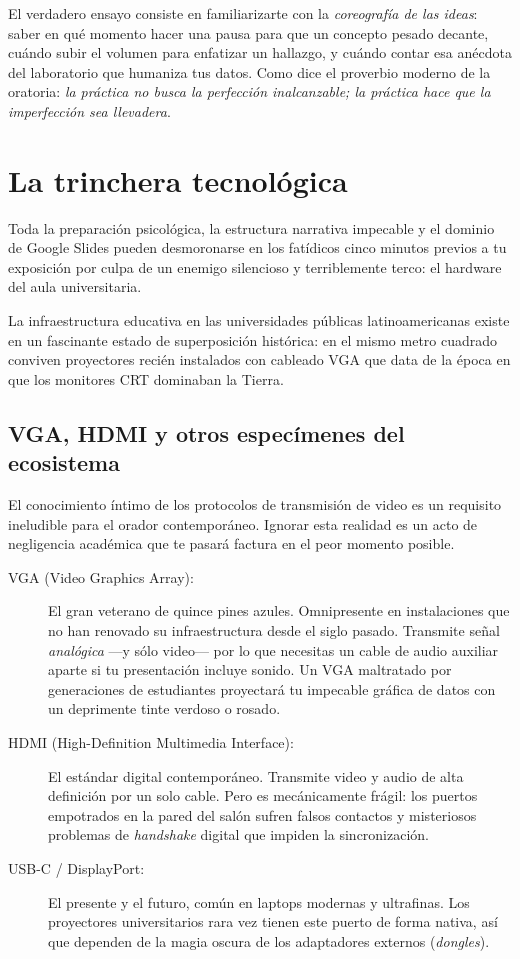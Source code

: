 El verdadero ensayo consiste en familiarizarte con la \emph{coreografía de las ideas}: saber en qué momento hacer una pausa para que un concepto pesado decante, cuándo subir el volumen para enfatizar un hallazgo, y cuándo contar esa anécdota del laboratorio que humaniza tus datos.
Como dice el proverbio moderno de la oratoria: \emph{la práctica no busca la perfección inalcanzable; la práctica hace que la imperfección sea llevadera}.

\section{La trinchera tecnológica}
\label{sec:trincheratecnologica}

Toda la preparación psicológica, la estructura narrativa impecable y el dominio de Google Slides pueden desmoronarse en los fatídicos cinco minutos previos a tu exposición por culpa de un enemigo silencioso y terriblemente terco: el hardware del aula universitaria.

La infraestructura educativa en las universidades públicas latinoamericanas existe en un fascinante estado de superposición histórica: en el mismo metro cuadrado conviven proyectores recién instalados con cableado VGA que data de la época en que los monitores CRT dominaban la Tierra.

\subsection*{VGA, HDMI y otros especímenes del ecosistema}

El conocimiento íntimo de los protocolos de transmisión de video es un requisito ineludible para el orador contemporáneo.
Ignorar esta realidad es un acto de negligencia académica que te pasará factura en el peor momento posible.

\begin{description}
	\item[VGA (Video Graphics Array):] El gran veterano de quince pines azules.
	      Omnipresente en instalaciones que no han renovado su infraestructura desde el siglo pasado.
	      Transmite señal \emph{analógica} —y sólo video— por lo que necesitas un cable de audio auxiliar aparte si tu presentación incluye sonido.
	      Un VGA maltratado por generaciones de estudiantes proyectará tu impecable gráfica de datos con un deprimente tinte verdoso o rosado.
	\item[HDMI (High-Definition Multimedia Interface):] El estándar digital contemporáneo.
	      Transmite video y audio de alta definición por un solo cable.
	      Pero es mecánicamente frágil: los puertos empotrados en la pared del salón sufren falsos contactos y misteriosos problemas de \emph{handshake} digital que impiden la sincronización.
	\item[USB-C / DisplayPort:] El presente y el futuro, común en laptops modernas y ultrafinas.
	      Los proyectores universitarios rara vez tienen este puerto de forma nativa, así que dependen de la magia oscura de los adaptadores externos (\emph{dongles}).
\end{description}

